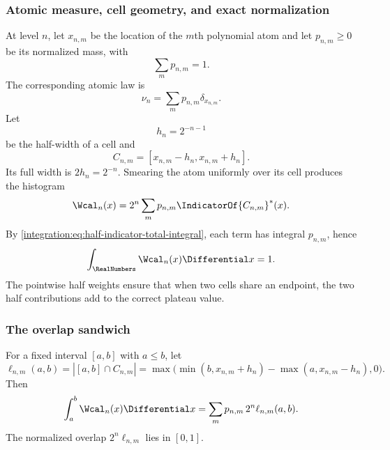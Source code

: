\documentclass[11pt,oneside]{article}
\theoremstyle{definition}
\theoremstyle{remark}
\begin{document}
\subsubsection{Atomic measure, cell geometry, and exact normalization}

At level $n$, let $x_{n,m}$ be the location of the $m$th polynomial atom and let
$p_{n,m}\ge0$ be its normalized mass, with
\begin{equation}
 \sum_m p_{n,m}=1.
 \label{integration:eq:atomic-mass-one}
\end{equation}
The corresponding atomic law is
\begin{equation}
 \nu_n=\sum_m p_{n,m}\delta_{x_{n,m}}.
 \label{integration:eq:polynomial-atomic-law}
\end{equation}
Let
\begin{equation}
 h_n=2^{-n-1}
 \label{integration:eq:step-half-width}
\end{equation}
be the half-width of a cell and
\begin{equation}
 C_{n,m}=[x_{n,m}-h_n,x_{n,m}+h_n].
 \label{integration:eq:step-cell}
\end{equation}
Its full width is $2h_n=2^{-n}$.  Smearing the atom uniformly over its cell produces the
histogram
\begin{equation}
 \Wcal_n(x)=2^n\sum_m p_{n,m}\IndicatorOf{C_{n,m}}^{*}(x).
 \label{integration:eq:histogram-from-atoms}
\end{equation}
By \eqref{integration:eq:half-indicator-total-integral}, each term has integral $p_{n,m}$, hence
\begin{equation}
 \int_\RealNumbers\Wcal_n(x)\Differential x=1.
 \label{integration:eq:histogram-mass-one}
\end{equation}
The pointwise half weights ensure that when two cells share an endpoint, the two half
contributions add to the correct plateau value.

\subsubsection{The overlap sandwich}

For a fixed interval $[a,b]$ with $a\le b$, let
\begin{equation}
 \ell_{n,m}(a,b)=|[a,b]\cap C_{n,m}|
 =\max\bigl(\min(b,x_{n,m}+h_n)-\max(a,x_{n,m}-h_n),0\bigr).
 \label{integration:eq:cell-overlap-length}
\end{equation}
Then
\begin{equation}
 \int_a^b\Wcal_n(x)\Differential x
 =\sum_m p_{n,m}\,2^n\ell_{n,m}(a,b).
 \label{integration:eq:histogram-overlap-sum}
\end{equation}
The normalized overlap $2^n\ell_{n,m}$ lies in $[0,1]$.
\end{document}
